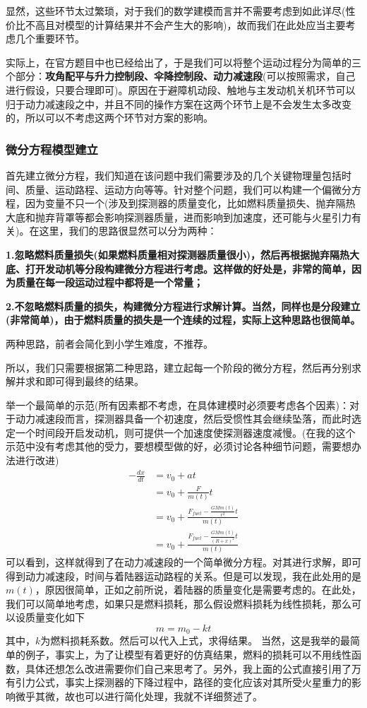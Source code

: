 \documentclass[]{article}
\begin{document}
	显然，这些环节太过繁琐，对于我们的数学建模而言并不需要考虑到如此详尽(性价比不高且对模型的计算结果并不会产生大的影响)，故而我们在此处应当主要考虑几个重要环节。
	
	实际上，在官方题目中也已经给出了，于是我们可以将整个运动过程分为简单的三个部分：\textbf{攻角配平与升力控制段、伞降控制段、动力减速段}(可以按照需求，自己进行假设，只要合理即可)。原因在于避障机动段、触地与主发动机关机环节可以归于动力减速段之中，并且不同的操作方案在这两个环节上是不会发生太多改变的，所以可以不考虑这两个环节对方案的影响。
\subsubsection{微分方程模型建立}
	首先建立微分方程，我们知道在该问题中我们需要涉及的几个关键物理量包括时间、质量、运动路程、运动方向等等。针对整个问题，我们可以构建一个偏微分方程，因为变量不只一个(涉及到探测器的质量变化，比如燃料质量损失、抛弃隔热大底和抛弃背罩等都会影响探测器质量，进而影响到加速度，还可能与火星引力有关)。在这里，我们的思路很显然可以分为两种：
	
\textbf{	1.忽略燃料质量损失(如果燃料质量相对探测器质量很小)，然后再根据抛弃隔热大底、打开发动机等分段构建微分方程进行考虑。这样做的好处是，非常的简单，因为质量在每一段运动过程中都将是一个常量；}
	
\textbf{	2.不忽略燃料质量的损失，构建微分方程进行求解计算。当然，同样也是分段建立(非常简单)，由于燃料质量的损失是一个连续的过程，实际上这种思路也很简单。}
	
	两种思路，前者会简化到小学生难度，不推荐。
	
	所以，我们只需要根据第二种思路，建立起每一个阶段的微分方程，然后再分别求解并求和即可得到最终的结果。
	
	举一个最简单的示范(所有因素都不考虑，在具体建模时必须要考虑各个因素)：对于动力减速段而言，探测器具备一个初速度，然后受惯性其会继续坠落，而此时选定一个时间段开启发动机，则可提供一个加速度使探测器速度减慢。(在我的这个示范中没有考虑其他的受力，要想模型做的好，必须讨论各种细节问题，需要想办法进行改进)
\begin{equation}
	\begin{split}
		-\frac{dx}{dt}&=v_0+at\\
		&=v_0+\frac{F}{m(t)}t\\
		&=v_0+\frac{F_{fuel}-\frac{GMm(t)}{r^2}t}{m(t)}\\
		&=v_0+\frac{F_{fuel}-\frac{GMm(t)}{(R+x)^2}t}{m(t)}
	\end{split}
\end{equation}
	可以看到，这样就得到了在动力减速段的一个简单微分方程。对其进行求解，即可得到动力减速段，时间与着陆器运动路程的关系。但是可以发现，我在此处用的是$m(t)$，原因很简单，正如之前所说，着陆器的质量变化是需要考虑的。在此处，我们可以简单地考虑，如果只是燃料损耗，那么假设燃料损耗为线性损耗，那么可以设质量变化如下
	\begin{equation}
		m=m_0-kt
	\end{equation}
其中，$k$为燃料损耗系数。然后可以代入上式，求得结果。
	当然，这是我举的最简单的例子，事实上，为了让模型有着更好的仿真结果，燃料的损耗可以不用线性函数，具体还想怎么改进需要你们自己来思考了。另外，我上面的公式直接引用了万有引力公式，事实上探测器的下降过程中，路径的变化应该对其所受火星重力的影响微乎其微，故也可以进行简化处理，我就不详细赘述了。
	
\end{document}
